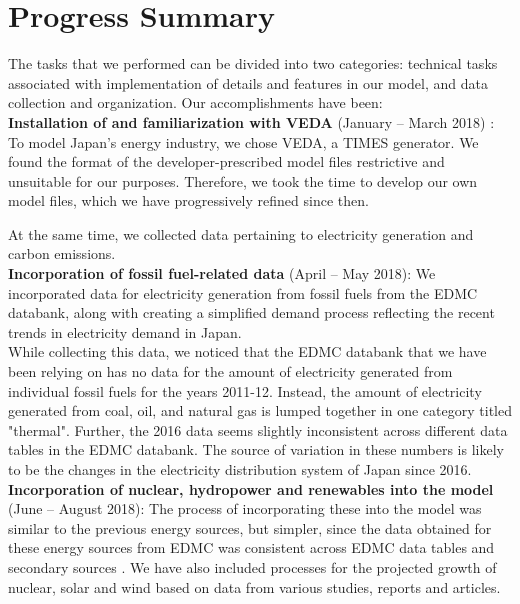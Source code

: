 \documentclass[14pt,a4paper]{article} %
\begin{document}
\section{Progress Summary}

The tasks that we performed can be divided into two categories: technical tasks associated with implementation of details and features in our model, and data collection and organization. Our accomplishments have been:\\

\textbf{Installation of and familiarization with VEDA} (January – March 2018) : To model Japan's energy industry, we chose VEDA, a \gls{TIMES} \cite{loulou_documentation_2005,gargiulo_documentation_2005} generator. We found the format of the developer-prescribed model files restrictive and unsuitable for our purposes. Therefore, we took the time to develop our own model files, which we have progressively refined since then.

At the same time, we collected data pertaining to electricity generation and carbon emissions.\\

\textbf{Incorporation of fossil fuel-related data} (April – May 2018): We incorporated data for electricity generation from fossil fuels from the \gls{EDMC} databank\cite{noauthor_energy_2018}, along with creating a simplified demand process reflecting the recent trends in electricity demand in Japan. \\

While collecting this data, we noticed that the \gls{EDMC} databank that we have been relying on has no data for the amount of electricity generated from individual fossil fuels for the years 2011-12. Instead, the amount of electricity generated from coal, oil, and natural gas is lumped together in one category titled "thermal". Further, the 2016 data seems slightly inconsistent across different data tables in the \gls{EDMC} databank. The source of variation in these numbers is likely to be the changes in the electricity distribution system of Japan since 2016.\\

\textbf{Incorporation of nuclear, hydropower and renewables into the model} (June – August 2018): The process of incorporating these into the model was similar to the previous energy sources, but simpler, since the data obtained for these energy sources from \gls{EDMC} was consistent across \gls{EDMC} data tables and secondary sources \cite{noauthor_energy_2018,noauthor_iea_2017, noauthor_japan_2017}. We have also included processes for the projected growth of nuclear, solar and wind based on data from various studies, reports and articles. \cite{publicover_japan_2017, dincer_analysis_2011,noauthor_geothermal_2018,heger_wind_2016,noauthor_operational_2013,noauthor_electricity_2017}\\
\end{document}
